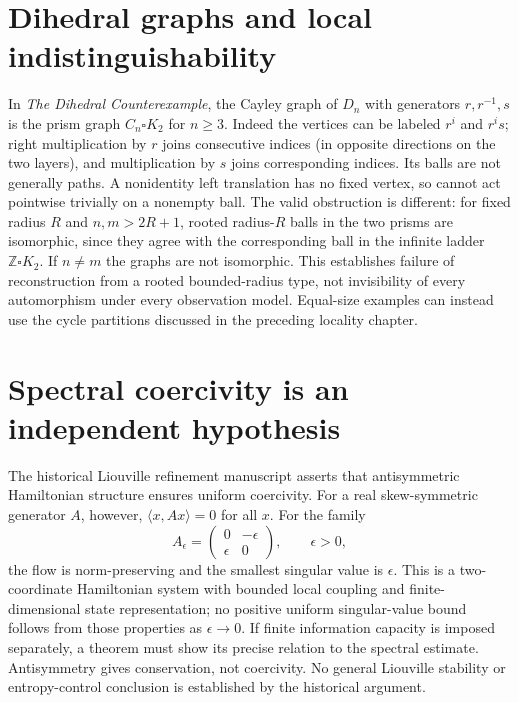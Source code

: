 \section{Dihedral graphs and local indistinguishability}
In \emph{The Dihedral Counterexample}, the Cayley graph of $D_n$ with generators $r,r^{-1},s$ is the prism graph $C_n\square K_2$ for $n\ge3$. Indeed the vertices can be labeled $r^i$ and $r^{i}s$; right multiplication by $r$ joins consecutive indices (in opposite directions on the two layers), and multiplication by $s$ joins corresponding indices. Its balls are not generally paths. A nonidentity left translation has no fixed vertex, so cannot act pointwise trivially on a nonempty ball.
The valid obstruction is different: for fixed radius $R$ and $n,m>2R+1$, rooted radius-$R$ balls in the two prisms are isomorphic, since they agree with the corresponding ball in the infinite ladder $\mathbb Z\square K_2$. If $n\ne m$ the graphs are not isomorphic. This establishes failure of reconstruction from a rooted bounded-radius type, not invisibility of every automorphism under every observation model. Equal-size examples can instead use the cycle partitions discussed in the preceding locality chapter.

\section{Spectral coercivity is an independent hypothesis}
The historical Liouville refinement manuscript asserts that antisymmetric Hamiltonian structure ensures uniform coercivity. For a real skew-symmetric generator $A$, however, $\langle x,Ax\rangle=0$ for all $x$. For the family
\[
A_\epsilon=\begin{pmatrix}0&-\epsilon\\\epsilon&0\end{pmatrix},
\qquad \epsilon>0,
\]
the flow is norm-preserving and the smallest singular value is $\epsilon$. This is a two-coordinate Hamiltonian system with bounded local coupling and finite-dimensional state representation; no positive uniform singular-value bound follows from those properties as $\epsilon\to0$. If finite information capacity is imposed separately, a theorem must show its precise relation to the spectral estimate. Antisymmetry gives conservation, not coercivity. No general Liouville stability or entropy-control conclusion is established by the historical argument.


